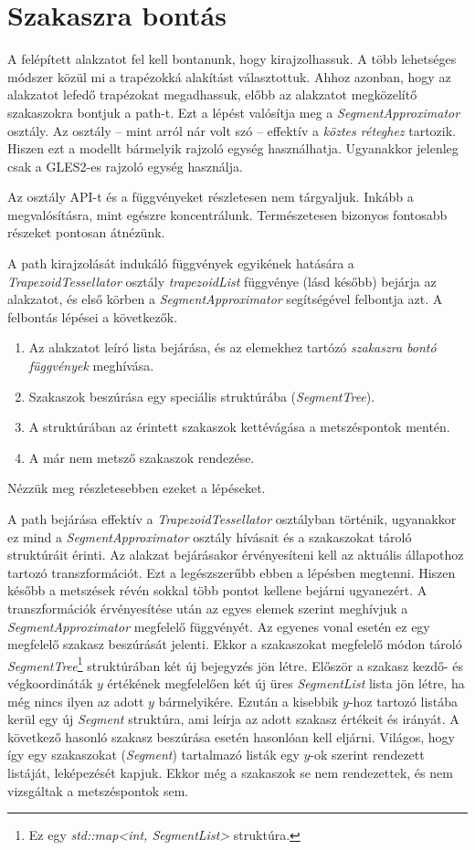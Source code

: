 \documentclass[12pt]{report}
\theoremstyle{definition}
\newcommand{\func}[1]{{\textsl{#1}}}
\begin{document}
  \section{Szakaszra bontás}

A felépített alakzatot fel kell bontanunk, hogy kirajzolhassuk. A több
lehetséges módszer közül mi a trapézokká alakítást választottuk. Ahhoz azonban,
hogy az alakzatot lefedő trapézokat megadhassuk, előbb az alakzatot megközelítő
szakaszokra bontjuk a path-t. Ezt a lépést valósítja meg a
\func{SegmentApproximator} osztály. Az osztály -- mint arról nár volt szó --
effektív a \emph{köztes réteghez} tartozik. Hiszen ezt a modellt bármelyik
rajzoló egység használhatja. Ugyanakkor jelenleg csak a GLES2-es rajzoló egység
használja.

Az osztály API-t és a függvényeket részletesen nem tárgyaljuk. Inkább a
megvalósításra, mint egészre koncentrálunk. Természetesen bizonyos
fontosabb részeket pontosan átnézünk.

A path kirajzolását indukáló függvények egyikének hatására a
\func{TrapezoidTessellator} osztály \func{trapezoidList} függvénye (lásd
később) bejárja az alakzatot, és első körben a \func{SegmentApproximator}
segítségével felbontja azt. A felbontás lépései a következők.
  \begin{enumerate}
    \item Az alakzatot leíró lista bejárása, és az elemekhez tartózó
    \emph{szakaszra bontó függvények} meghívása.
    \item Szakaszok beszúrása egy speciális struktúrába (\func{SegmentTree}).
    \item A struktúrában az érintett szakaszok kettévágása a metszéspontok
    mentén.
    \item A már nem metsző szakaszok rendezése.
  \end{enumerate}
Nézzük meg részletesebben ezeket a lépéseket.

A path bejárása effektív a \func{TrapezoidTessellator} osztályban történik,
ugyanakkor ez mind a \func{SegmentApproximator} osztály hívásait és a
szakaszokat tároló struktúráit érinti. Az alakzat bejárásakor érvényesíteni
kell az aktuális állapothoz tartozó transzformációt. Ezt a legészszerűbb ebben
a lépésben megtenni. Hiszen később a metszések révén sokkal több pontot kellene
bejárni ugyanezért. A transzformációk érvényesítése után az egyes elemek
szerint meghívjuk a \func{SegmentApproximator} megfelelő függvényét. Az egyenes
vonal esetén ez egy megfelelő szakasz beszúrását jelenti. Ekkor a szakaszokat
megfelelő módon tároló \func{SegmentTree}\footnote{Ez egy \func{std::map<int,
SegmentList>} struktúra.} struktúrában két új bejegyzés jön létre. Először a
szakasz kezdő- és végkoordináták $y$ értékének megfelelően két új üres
\func{SegmentList} lista jön létre, ha még nincs ilyen az adott $y$
bármelyikére. Ezután a kisebbik $y$-hoz tartozó listába kerül egy új
\func{Segment} struktúra, ami leírja az adott szakasz értékeit és irányát. A
következő hasonló szakasz beszúrása esetén hasonlóan kell eljárni. Világos,
hogy így egy szakaszokat (\func{Segment}) tartalmazó listák egy $y$-ok szerint
rendezett listáját, leképezését kapjuk. Ekkor még a szakaszok se nem
rendezettek, és nem vizsgáltak a metszéspontok sem.
\end{document}
